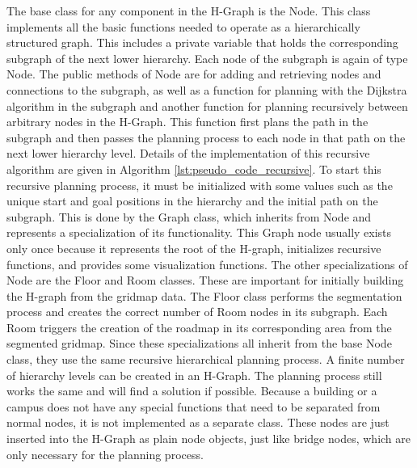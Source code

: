 The base class for any component in the H-Graph is the Node. This class implements all the basic functions needed to operate as a hierarchically structured graph. This includes a private variable that holds the corresponding subgraph of the next lower hierarchy. Each node of the subgraph is again of type Node. The public methods of Node are for adding and retrieving nodes and connections to the subgraph, as well as a function for planning with the Dijkstra algorithm in the subgraph and another function for planning recursively between arbitrary nodes in the H-Graph. This function first plans the path in the subgraph and then passes the planning process to each node in that path on the next lower hierarchy level. Details of the implementation of this recursive algorithm are given in Algorithm \ref{lst:pseudo_code_recursive}. To start this recursive planning process, it must be initialized with some values such as the unique start and goal positions in the hierarchy and the initial path on the subgraph. This is done by the Graph class, which inherits from Node and represents a specialization of its functionality. This Graph node usually exists only once because it represents the root of the H-graph, initializes recursive functions, and provides some visualization functions. The other specializations of Node are the Floor and Room classes. These are important for initially building the H-graph from the gridmap data. The Floor class performs the segmentation process and creates the correct number of Room nodes in its subgraph. Each Room triggers the creation of the roadmap in its corresponding area from the segmented gridmap. Since these specializations all inherit from the base Node class, they use the same recursive hierarchical planning process. A finite number of hierarchy levels can be created in an H-Graph. The planning process still works the same and will find a solution if possible. Because a building or a campus does not have any special functions that need to be separated from normal nodes, it is not implemented as a separate class. These nodes are just inserted into the H-Graph as plain node objects, just like bridge nodes, which are only necessary for the planning process.

